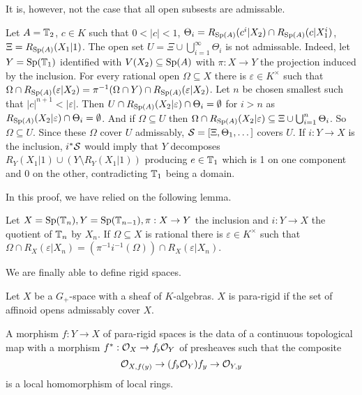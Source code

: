 It is, however, not the case that all open subsests are admissable. 
\begin{example}
    Let $A=\mathbb{T}_{2}$, $c\in K$ such that $0<|c|<1$, $\Theta_{i}=R_{\mathrm{Sp}(A)}(c^{i}|X_{2})\cap R_{\mathrm{Sp}(A)}(c|X_{1}^{i})$, $\Xi=R_{\mathrm{Sp}(A)}(X_{1}|1)$. The open set $U=\Xi\cup\bigcup_{i=1}^{\infty}\Theta_{i}$ is not admissable. Indeed, let $Y=\mathrm{Sp}(\mathbb{T}_{1})$ identified with $V(X_{2})\subseteq\mathrm{Sp}(A)$ with $\pi:X\to Y$ the projection induced by the inclusion. For every rational open $\Omega\subseteq X$ there is $\varepsilon\in K^{\times}$ such that $\Omega\cap R_{\mathrm{Sp}(A)}(\varepsilon|X_{2})=\pi^{-1}(\Omega\cap Y)\cap R_{\mathrm{Sp}(A)}(\varepsilon|X_{2})$. Let $n$ be chosen smallest such that $|c|^{n+1}<|\varepsilon|$. Then $U\cap R_{\mathrm{Sp}(A)}(X_{2}|\varepsilon)\cap\Theta_{i}=\emptyset$ for $i>n$ as $R_{\mathrm{Sp}(A)}(X_{2}|\varepsilon)\cap\Theta_{i}=\emptyset$. And if $\Omega\subseteq U$ then $\Omega\cap R_{\mathrm{Sp}(A)}(X_{2}|\varepsilon)\subseteq\Xi\cup\bigcup_{i=1}^{n}\Theta_{i}$. So $\Omega\subseteq U$. Since these $\Omega$ cover $U$ admissably, $\mathcal{S}=[\Xi,\Theta_{1},\dots]$ covers $U$. If $i:Y\to X$ is the inclusion, $i^{*}\mathcal{S}$ would imply that $Y$ decomposes $R_{Y}(X_{1}|1)\cup(Y\setminus R_{Y}(X_{1}|1))$ producing $e\in \mathbb{T}_{1}$ which is 1 on one component and 0 on the other, contradicting $\mathbb{T}_{1}$ being a domain. 
\end{example}
In this proof, we have relied on the following lemma. 
\begin{lemma}
    Let $X=\mathrm{Sp}(\mathbb{T}_{n}),Y=\mathrm{Sp}(\mathbb{T}_{n-1}), \pi:X\to Y$ the inclusion and $i:Y\to X$ the quotient of $\mathbb{T}_{n}$ by $X_{n}$. If $\Omega\subseteq X$ is rational there is $\varepsilon\in K^{\times}$ such that $\Omega\cap R_{X}(\varepsilon|X_{n})=(\pi^{-1}i^{-1}(\Omega))\cap R_{X}(\varepsilon|X_{n})$. 
\end{lemma}
We are finally able to define rigid spaces. 
\begin{definition}\label{def: para-rigid space}
    Let $X$ be a $G_{+}$-space with a sheaf of $K$-algebras. $X$ is para-rigid if the set of affinoid opens admissably cover $X$. 
\end{definition}
\begin{definition}\label{def: morphism of pararigid spaces}
    A morphism $f:Y\to X$ of para-rigid spaces is the data of a continuous topological map with a morphism $f^{*}:\mathcal{O}_{X}\to f_{\flat}\mathcal{O}_{Y}$ of presheaves such that the composite 
    $$\mathcal{O}_{X,f(y)}\to(f_{\flat}\mathcal{O}_{Y})f_{y}\to\mathcal{O}_{Y,y}$$
    is a local homomorphism of local rings. 
\end{definition}
